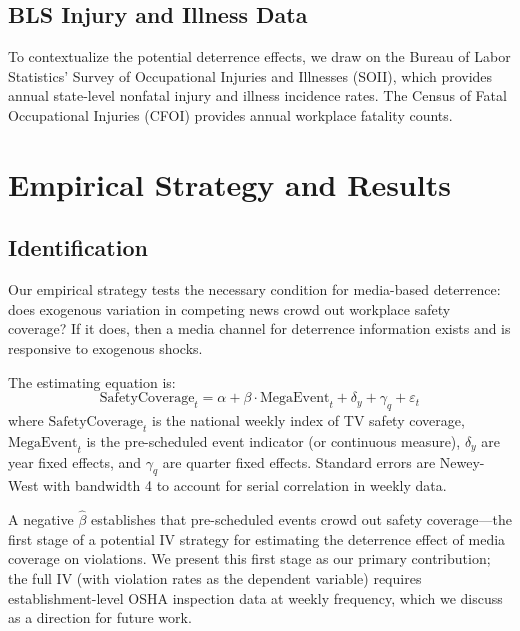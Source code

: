 \documentclass[12pt]{article}
\begin{document}
\subsection{BLS Injury and Illness Data}

To contextualize the potential deterrence effects, we draw on the Bureau of Labor Statistics' Survey of Occupational Injuries and Illnesses (SOII), which provides annual state-level nonfatal injury and illness incidence rates. The Census of Fatal Occupational Injuries (CFOI) provides annual workplace fatality counts.




\section{Empirical Strategy and Results}\label{sec:empirical}

\subsection{Identification}

Our empirical strategy tests the necessary condition for media-based deterrence: does exogenous variation in competing news crowd out workplace safety coverage? If it does, then a media channel for deterrence information exists and is responsive to exogenous shocks.

The estimating equation is:
\begin{equation}
\text{SafetyCoverage}_{t} = \alpha + \beta \cdot \text{MegaEvent}_{t} + \delta_{y} + \gamma_{q} + \varepsilon_{t}
\label{eq:main}
\end{equation}
where $\text{SafetyCoverage}_{t}$ is the national weekly index of TV safety coverage, $\text{MegaEvent}_{t}$ is the pre-scheduled event indicator (or continuous measure), $\delta_{y}$ are year fixed effects, and $\gamma_{q}$ are quarter fixed effects. Standard errors are Newey-West with bandwidth 4 to account for serial correlation in weekly data.

A negative $\hat{\beta}$ establishes that pre-scheduled events crowd out safety coverage---the first stage of a potential IV strategy for estimating the deterrence effect of media coverage on violations. We present this first stage as our primary contribution; the full IV (with violation rates as the dependent variable) requires establishment-level OSHA inspection data at weekly frequency, which we discuss as a direction for future work.
\end{document}
